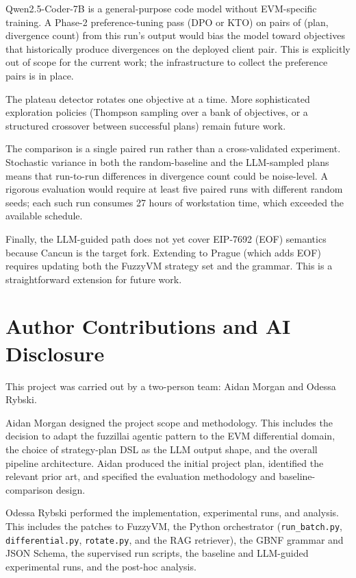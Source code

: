 \documentclass[conference]{IEEEtran}
\begin{document}
Qwen2.5-Coder-7B is a general-purpose code model without EVM-specific training. A Phase-2 preference-tuning pass (DPO or KTO) on pairs of (plan, divergence count) from this run's output would bias the model toward objectives that historically produce divergences on the deployed client pair. This is explicitly out of scope for the current work; the infrastructure to collect the preference pairs is in place.

The plateau detector rotates one objective at a time. More sophisticated exploration policies (Thompson sampling over a bank of objectives, or a structured crossover between successful plans) remain future work.

The comparison is a single paired run rather than a cross-validated experiment. Stochastic variance in both the random-baseline and the LLM-sampled plans means that run-to-run differences in divergence count could be noise-level. A rigorous evaluation would require at least five paired runs with different random seeds; each such run consumes 27 hours of workstation time, which exceeded the available schedule.

Finally, the LLM-guided path does not yet cover EIP-7692 (EOF) semantics because Cancun is the target fork. Extending to Prague (which adds EOF) requires updating both the FuzzyVM strategy set and the grammar. This is a straightforward extension for future work.

\section{Author Contributions and AI Disclosure}

This project was carried out by a two-person team: Aidan Morgan and Odessa Rybski.

Aidan Morgan designed the project scope and methodology. This includes the decision to adapt the fuzzillai agentic pattern to the EVM differential domain, the choice of strategy-plan DSL as the LLM output shape, and the overall pipeline architecture. Aidan produced the initial project plan, identified the relevant prior art, and specified the evaluation methodology and baseline-comparison design.

Odessa Rybski performed the implementation, experimental runs, and analysis. This includes the patches to FuzzyVM, the Python orchestrator (\texttt{run\_batch.py}, \texttt{differential.py}, \texttt{rotate.py}, and the RAG retriever), the GBNF grammar and JSON Schema, the supervised run scripts, the baseline and LLM-guided experimental runs, and the post-hoc analysis.
\end{document}
